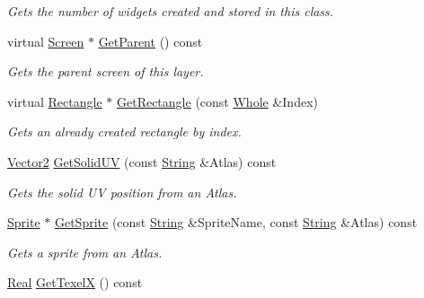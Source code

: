 \begin{DoxyCompactItemize}
\begin{DoxyCompactList}\small\item\em Gets the number of widgets created and stored in this class. \item\end{DoxyCompactList}\item 
virtual \hyperlink{classMezzanine_1_1UI_1_1Screen}{Screen} $\ast$ \hyperlink{classMezzanine_1_1UI_1_1Layer_aeaf2e6f3680d39098f475226da4938ae}{GetParent} () const 
\begin{DoxyCompactList}\small\item\em Gets the parent screen of this layer. \item\end{DoxyCompactList}\item 
virtual \hyperlink{classMezzanine_1_1UI_1_1Rectangle}{Rectangle} $\ast$ \hyperlink{classMezzanine_1_1UI_1_1Layer_af68871cb8f544227caa25ccc5666c944}{GetRectangle} (const \hyperlink{namespaceMezzanine_adcbb6ce6d1eb4379d109e51171e2e493}{Whole} \&Index)
\begin{DoxyCompactList}\small\item\em Gets an already created rectangle by index. \item\end{DoxyCompactList}\item 
\hyperlink{classMezzanine_1_1Vector2}{Vector2} \hyperlink{classMezzanine_1_1UI_1_1Layer_a71d7dec7c9713f2a5ad78afec20a327b}{GetSolidUV} (const \hyperlink{namespaceMezzanine_acf9fcc130e6ebf08e3d8491aebcf1c86}{String} \&Atlas) const 
\begin{DoxyCompactList}\small\item\em Gets the solid UV position from an Atlas. \item\end{DoxyCompactList}\item 
\hyperlink{structMezzanine_1_1UI_1_1Sprite}{Sprite} $\ast$ \hyperlink{classMezzanine_1_1UI_1_1Layer_ab585d069f110f339143c909453f66b30}{GetSprite} (const \hyperlink{namespaceMezzanine_acf9fcc130e6ebf08e3d8491aebcf1c86}{String} \&SpriteName, const \hyperlink{namespaceMezzanine_acf9fcc130e6ebf08e3d8491aebcf1c86}{String} \&Atlas) const 
\begin{DoxyCompactList}\small\item\em Gets a sprite from an Atlas. \item\end{DoxyCompactList}\item 
\hyperlink{namespaceMezzanine_a726731b1a7df72bf3583e4a97282c6f6}{Real} \hyperlink{classMezzanine_1_1UI_1_1Layer_aa881a701c19e9828e76ef943d504bd83}{GetTexelX} () const 

\end{DoxyCompactItemize}
